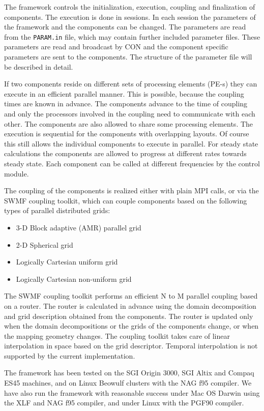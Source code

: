 The framework controls the initialization, execution, coupling and
finalization of components.  The execution is done in sessions. In
each session the parameters of the framework and the components can be
changed.  The parameters are read from the {\tt PARAM.in} file, which
may contain further included parameter files.  These parameters are
read and broadcast by CON and the component specific parameters are
sent to the components. The structure of the parameter file will be
described in detail.

If two components reside on different sets of processing elements
(PE-s) they can execute in an efficient parallel manner.
This is possible, because the coupling times are
known in advance.  The components advance to the time of coupling and
only the processors involved in the coupling need to communicate with
each other. The components are also allowed to share some processing elements.
The execution is sequential for the components with overlapping layouts.
Of course this still allows the individual components to execute in parallel.
For steady state calculations the components are allowed to progress
at different rates towards steady state. Each component can be called
at different frequencies by the control module.

The coupling of the components is realized either with plain MPI
calls, or via the SWMF coupling toolkit, which can couple components
based on the following types of parallel distributed grids:
\begin{itemize}
\item 3-D Block adaptive (AMR) parallel grid
\item 2-D Spherical grid
\item Logically Cartesian uniform grid
\item Logically Cartesian non-uniform grid 
\end{itemize}
The SWMF coupling toolkit performs an efficient N to M parallel
coupling based on a router. The router is calculated in advance using
the domain decomposition and grid description obtained from the
components.  The router is updated only when the domain decompositions
or the grids of the components change, or when the mapping geometry
changes.  The coupling toolkit takes care of linear interpolation in
space based on the grid descriptor.  Temporal interpolation is not
supported by the current implementation.

The framework has been tested on the SGI Origin 3000, SGI Altix and 
Compaq ES45 machines, and on Linux Beowulf clusters with the NAG f95 
compiler. We have also run the framework with reasonable success under
Mac OS Darwin using the XLF and NAG f95 compiler, and under Linux with
the PGF90 compiler.

